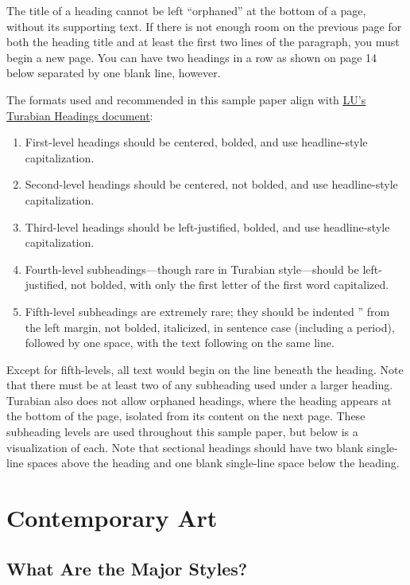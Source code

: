 \documentclass[raggedright]{turabian-researchpaper}
\newcommand*{\bluehref}[2]{\href{#1}{\color{blue}\underline{#2}}}
\begin{document}
The title of a heading cannot be left ``orphaned'' at the bottom of a page,
without its supporting text.\autocite[393]{Turabian} If there is not enough room
on the previous page for both the heading title and at least the first two lines
of the paragraph, you must begin a new page. You can have two headings in a row
as shown on page 14 below separated by one blank line, however.

The formats used and recommended in this sample paper align with
\bluehref{http://www.liberty.edu/academics/graduate/writing/index.cfm?PID=34282}{LU's
Turabian Headings document}:
\begin{enumerate}
\item First-level headings should be centered, bolded, and use headline-style
  capitalization.
\item Second-level headings should be centered, not bolded, and use
  headline-style capitalization.
\item Third-level headings should be left-justified, bolded, and use
  headline-style capitalization.
\item Fourth-level subheadings---though rare in Turabian style---should be
  left-justified, not bolded, with only the first letter of the first word
  capitalized.
\item Fifth-level subheadings are extremely rare; they should be indented
  '' from the left margin, not bolded, italicized, in sentence case
  (including a period), followed by one space, with the text following on the
  same line.
\end{enumerate}

Except for fifth-levels, all text would begin on the line beneath the heading.
Note that there must be at least two of any subheading used under a larger
heading. Turabian also does not allow orphaned headings, where the heading
appears at the bottom of the page, isolated from its content on the next
page.\autocite[393]{Turabian} These subheading levels are used throughout this
sample paper, but below is a visualization of each. Note that sectional headings
should have two blank single-line spaces above the heading and one blank
single-line space below the heading.

\section*{Contemporary Art}

\subsection{What Are the Major Styles?}
\end{document}
